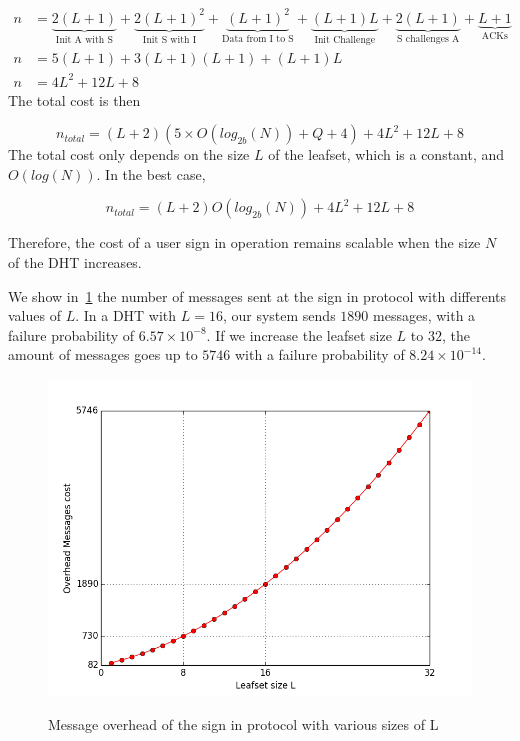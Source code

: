     \begin{align}
      n &= \underbrace{2(L+1)}_\text{Init A with S} +
           \underbrace{2(L+1)^2}_\text{Init S with I} +
           \underbrace{(L+1)^2}_\text{Data from I to S} +
           \underbrace{(L+1)L}_\text{Init Challenge} +
           \underbrace{2(L+1)}_\text{S challenges A} +
           \underbrace{L+1}_\text{ACKs}\\
      n &= 5(L+1) + 3(L+1)(L+1)+ (L+1)L\\
      n &= 4L^2 +12L + 8 
    \end{align}
     The total cost is then

    $$
      n_{total} = (L +2)(5 \times O(log_{2b}(N)) + Q + 4) + 4L^2 +12L + 8 
    $$    
    The total cost only depends on the size $L$ of the leafset, which is a
constant, and $O(log(N))$. In the best case, 

    $$
      n_{total} = (L +2)O(log_{2b}(N)) + 4L^2 +12L + 8 
    $$

    Therefore, the cost of a user sign in operation remains
scalable when the size $N$ of the DHT increases.

    We show in~\ref{fig:sign_in_messages} the number of messages sent at
the sign in protocol with differents values of $L$. In a DHT with
$L = 16$, our system sends $1890$ messages, with a failure probability of
 $6.57 \times 10^{-8}$. If we increase the leafset size $L$ to $32$, the amount of
messages goes up to $5746$ with a failure probability of $8.24 \times 10^{-14}$.


\begin{figure}[!htb]
\centering
\includegraphics[width=14cm]{../plots/sign_in_messages}\\
\caption{Message overhead of the sign in protocol with various sizes of L}
\label{fig:sign_in_messages}
\end{figure}

